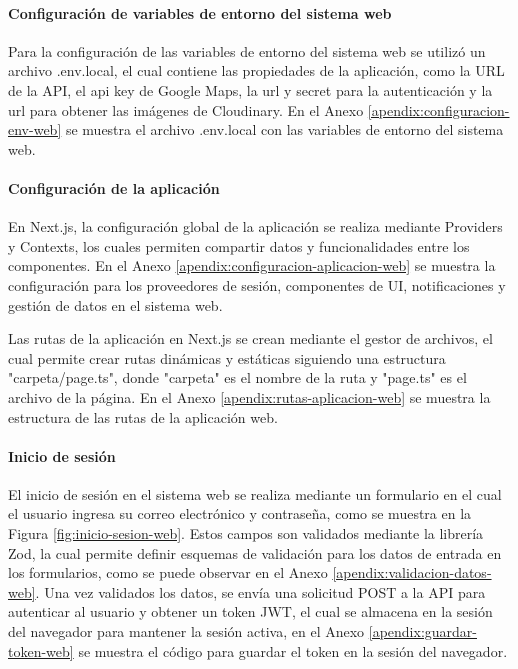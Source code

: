 \paragraph{Configuración de variables de entorno del sistema web}
Para la configuración de las variables de entorno del sistema web se utilizó un archivo .env.local, el cual contiene las propiedades
de la aplicación, como la URL de la API, el api key de Google Maps, la url y secret para la autenticación y la url
para obtener las imágenes de Cloudinary. En el Anexo \ref{apendix:configuracion-env-web} se muestra el archivo .env.local con las
variables de entorno del sistema web.

\paragraph{Configuración de la aplicación}
En Next.js, la configuración global de la aplicación se realiza mediante Providers y Contexts, los cuales permiten compartir datos y
funcionalidades entre los componentes. En el Anexo \ref{apendix:configuracion-aplicacion-web} se muestra la configuración para los
proveedores de sesión, componentes de UI, notificaciones y gestión de datos en el sistema web.

Las rutas de la aplicación en Next.js se crean mediante el gestor de archivos, el cual permite crear rutas dinámicas y estáticas
siguiendo una estructura "carpeta/page.ts", donde "carpeta" es el nombre de la ruta y "page.ts" es el archivo de la página. En el
Anexo \ref{apendix:rutas-aplicacion-web} se muestra la estructura de las rutas de la aplicación web.

\paragraph{Inicio de sesión}
El inicio de sesión en el sistema web se realiza mediante un formulario en el cual el usuario ingresa su correo electrónico y
contraseña, como se muestra en la Figura \ref{fig:inicio-sesion-web}. Estos campos son validados mediante la librería Zod, la
cual permite definir esquemas de validación para los datos de entrada en los formularios, como se puede observar en el Anexo
\ref{apendix:validacion-datos-web}. Una vez validados los datos, se envía una solicitud POST a la API para autenticar al usuario
y obtener un token JWT, el cual se almacena en la sesión del navegador para mantener la sesión activa, en el Anexo
\ref{apendix:guardar-token-web} se muestra el código para guardar el token en la sesión del navegador.

